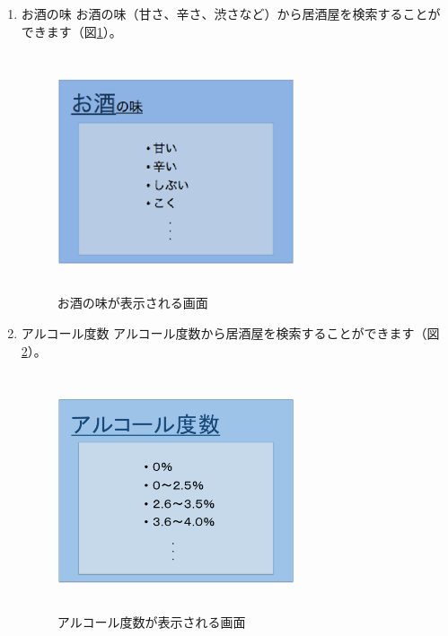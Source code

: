 \documentclass[a4j,titlepage]{jarticle}
\begin{document}
\begin{enumerate}
\item お酒の味
お酒の味（甘さ、辛さ、渋さなど）から居酒屋を検索することができます（図\ref{fig:4}）。

\begin {figure}[htbp]
    \begin{center}
    \includegraphics [height=7cm, width=7cm]{extrnal_design_document_image/4.eps}
    \caption {お酒の味が表示される画面}
    \label {fig:4}
    \end{center}
\end {figure}

\item アルコール度数
アルコール度数から居酒屋を検索することができます（図\ref{fig:5}）。

\begin {figure}[htbp]
    \begin{center}
    \includegraphics [height=7cm, width=7cm]{extrnal_design_document_image/5.eps}
    \caption {アルコール度数が表示される画面}
    \label {fig:5}
    \end{center}
\end {figure}

\end{enumerate}
\end{document}
